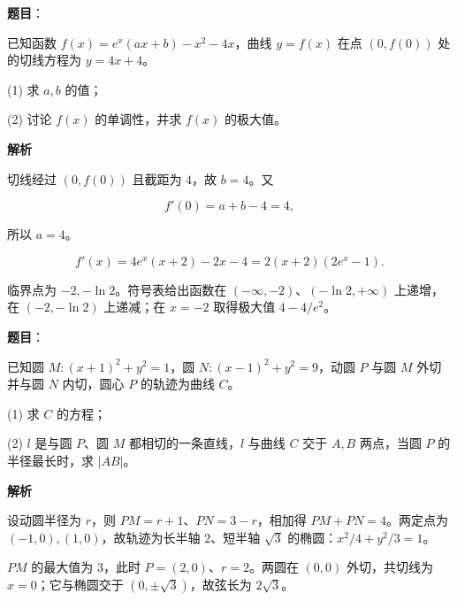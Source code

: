 \begin{answer}

\textbf{题目}：

已知函数 $f(x)=e^x(ax+b)-x^2-4x$，曲线 $y=f(x)$ 在点 $(0,f(0))$ 处的切线方程为 $y=4x+4$。

(1) 求 $a,b$ 的值；

(2) 讨论 $f(x)$ 的单调性，并求 $f(x)$ 的极大值。

\textbf{解析}


切线经过 $(0,f(0))$ 且截距为 $4$，故 $b=4$。又

\nopagebreak[4]
\[
f'(0)=a+b-4=4,
\]

所以 $a=4$。


\nopagebreak[4]
\[
f'(x)=4e^x(x+2)-2x-4=2(x+2)(2e^x-1).
\]

临界点为 $-2,-\ln2$。符号表给出函数在 $(-\infty,-2)$、$(-\ln2,+\infty)$ 上递增，在 $(-2,-\ln2)$ 上递减；在 $x=-2$ 取得极大值 $4-4/e^2$。



\end{answer}
\begin{answer}

\textbf{题目}：

已知圆 $M:(x+1)^2+y^2=1$，圆 $N:(x-1)^2+y^2=9$，动圆 $P$ 与圆 $M$ 外切并与圆 $N$ 内切，圆心 $P$ 的轨迹为曲线 $C$。

(1) 求 $C$ 的方程；

(2) $l$ 是与圆 $P$、圆 $M$ 都相切的一条直线，$l$ 与曲线 $C$ 交于 $A,B$ 两点，当圆 $P$ 的半径最长时，求 $|AB|$。

\textbf{解析}


设动圆半径为 $r$，则 $PM=r+1$、$PN=3-r$，相加得 $PM+PN=4$。两定点为 $(-1,0),(1,0)$，故轨迹为长半轴 $2$、短半轴 $\sqrt3$ 的椭圆：$x^2/4+y^2/3=1$。


$PM$ 的最大值为 $3$，此时 $P=(2,0)$、$r=2$。两圆在 $(0,0)$ 外切，共切线为 $x=0$；它与椭圆交于 $(0,\pm\sqrt3)$，故弦长为 $2\sqrt3$。



\end{answer}
